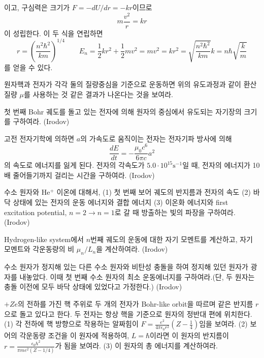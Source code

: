 이고, 구심력은 크기가 $F=-dU/dr=-kr$이므로 
\begin{equation}
m\frac{v^2}{r}=kr
\end{equation}
이 성립한다. 이 두 식을 연립하면
\begin{equation}
r=\left ( \frac{n^2\hbar^2}{km}\right )^{1/4}\quad\quad E_n = \frac{1}{2}kr^2 + \frac{1}{2}mv^2 = mv^2 = kr^2 = \sqrt{\frac{n^2\hbar^2}{km}}k=n\hbar \sqrt{\frac{k}{m}}
\end{equation}
를 얻을 수 있다.
\begin{exercise}[환산질량 보정]
원자핵과 전자가 각각 둘의 질량중심을 기준으로 운동하면 위의 유도과정과 같이 환산질량 $\mu$를 사용하는 것 같은 결과가 나온다는 것을 보여라.
\end{exercise}

\begin{problem}
첫 번째 Bohr 궤도를 돌고 있는 전자에 의해 원자의 중심에서 유도되는 자기장의 크기를 구하여라. (Irodov)
\end{problem}

\begin{problem}
고전 전자기학에 의하면 $a$의 가속도로 움직이는 전자는 전자기파 방사에 의해
\begin{equation}
\frac{dE}{dt}=-\frac{\mu_0c^6}{6\pi c}a^2
\end{equation}
의 속도로 에너지를 잃게 된다. 전자의 각속도가 $5.0\cdot 10^{15}\mathrm{s^{-1}}$일 때, 전자의 에너지가 10배 줄어들기까지 걸리는 시간을 구하여라. (Irodov) 
\end{problem}

\begin{problem}
수소 원자와 $\mathrm{He^+}$ 이온에 대해서,
(1) 첫 번째 보어 궤도의 반지름과 전자의 속도 (2) 바닥 상태에 있는 전자의 운동 에너지와 결합 에너지 (3) 이온화 에너지와 first excitation potential, $n=2\to n=1$로 갈 때 방출하는 빛의 파장을 구하여라. (Irodov)\end{problem}

\begin{problem}
Hydrogen-like system에서 $n$번째 궤도의 운동에 대한 자기 모멘트를 계산하고, 자기 모멘트와 각운동량의 비 $\mu_n/L_n$을 계산하여라. (Irodov)
\end{problem}

\begin{problem}
수소 원자가 정지해 있는 다른 수소 원자와 비탄성 충돌을 하여 정지해 있던 원자가 광자를 내놓았다. 이때 첫 번째 수소 원자의 최소 운동에너지를 구하여라.(단, 두 원자는 충돌 이전에 모두 바닥 상태에 있었다고 가정한다.) (Irodov)
\end{problem}

\begin{problem}
$+Ze$의 전하를 가진 핵 주위로 두 개의 전자가 Bohr-like orbit을 따르며 같은 반지름 $r$으로 돌고 있다고 한다. 두 전자는 항상 핵을 기준으로 원자의 정반대 편에 위치한다. (1) 각 전하에 핵 방향으로 작용하는 알짜힘이 $F=\frac{e^2}{4\pi \epsilon_0 r^2}(Z-\frac{1}{4})$임을 보여라. (2) 보어의 각운동량 조건을 이 원자에 적용하여, $L=\hbar$이라면 이 원자의 반지름이 $r=\frac{\epsilon_0 h^2 }{\pi m e^2 (Z-1/4)}$가 됨을 보여라. (3) 이 원자의 총 에너지를 계산하여라.
\end{problem}


